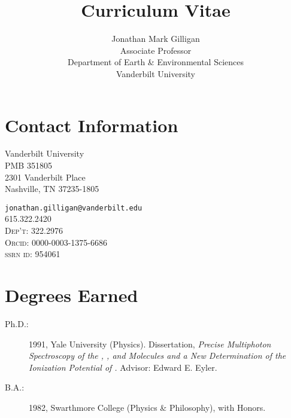 \documentclass[10pt]{article}
\title{Curriculum Vitae}
\date{\thedate}
\author{Jonathan Mark Gilligan\\
\normalsize Associate Professor\\
Department of Earth \& Environmental Sciences\\
Vanderbilt University}
\begin{document}
\maketitle
\tableofcontents

\section{Contact Information}
\noindent
\parbox[t]{0.45\textwidth}{%
Vanderbilt University\\
PMB 351805\\
2301 Vanderbilt Place\\
Nashville, TN 37235-1805
}
\parbox[t]{0.5\textwidth}{\raggedleft
{\small
    \nolinkurl{jonathan.gilligan@vanderbilt.edu}}\\
    615.322.2420\\
    \textsc{Dep't:} 322.2976\\
    \textsc{Orcid:} 0000-0003-1375-6686\\
    \textsc{ssrn id:} 954061\\
    \qquad{}
}


\section{Degrees Earned}
\begin{description}
\item[Ph.D.:] 1991, Yale University (Physics). Dissertation, \emph{Precise Multiphoton Spectroscopy of the , , and  Molecules and a New Determination of the Ionization Potential of .} Advisor: Edward E. Eyler.
\item[B.A.:] 1982, Swarthmore College (Physics \& Philosophy), with Honors.
\end{description}
\end{document}

